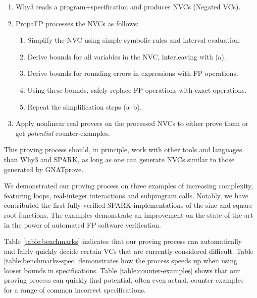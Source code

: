 \documentclass[runningheads]{llncs}
\begin{document}
\begin{enumerate}
  \item Why3 reads a program+specification and produces NVCs (Negated VCs). %
  \item PropaFP processes the NVCs as follows:
  \begin{enumerate}
    \item Simplify the NVC using simple symbolic rules and interval evaluation.
    \item Derive bounds for all variables in the NVC, interleaving with (a).
    \item Derive bounds for rounding errors in expressions with FP operations.
    \item Using these bounds, safely replace FP operations with exact operations.
    \item Repeat the simplification steps (a--b).
  \end{enumerate}
  \item Apply nonlinear real provers on the processed NVCs to either prove them or get \emph{potential} counter-examples.
\end{enumerate}

This proving process should, in principle, work with other tools and languages than Why3 and SPARK, as long as one can generate NVCs similar to those generated by GNATprove. 

We demonstrated our proving process on three examples of increasing complexity, featuring loops, real-integer interactions and subprogram calls.
Notably, we have contributed the first fully verified SPARK implementations of the sine and square root functions. 
The examples demonstrate an improvement on the state-of-the-art in the power of automated FP software verification.


Table \ref{table:benchmarks} indicates that our proving process can automatically and fairly quickly decide certain VCs that are currently considered difficult.
Table \ref{table:benchmarks-spec} demonstrates how the process speeds up when using looser bounds in specifications.
Table \ref{table:counter-examples} shows that our proving process can quickly find potential, often even actual, counter-examples for a range of common incorrect specifications.
\end{document}
